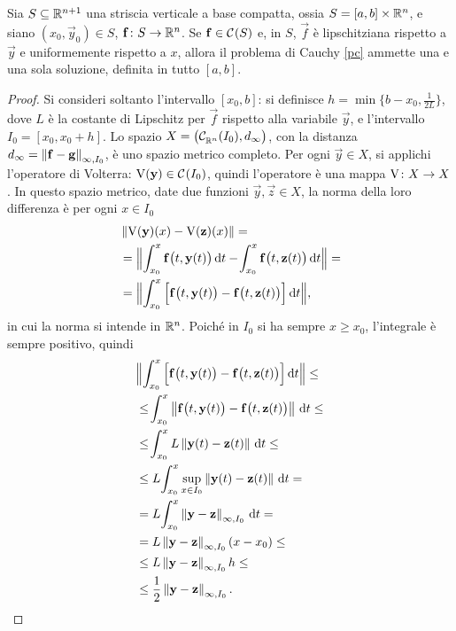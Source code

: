 \begin{teorema} \label{t:E-globale}
	Sia $S\subseteq\mathbb{R}^{n+1}$ una striscia verticale a base compatta, ossia $S=[a,b]\times\mathbb{R}^n$, e siano $(x_0,\vec y_0)\in S$, $\mathbf{f}\colon S\to\mathbb{R}^n$. Se $\mathbf{f}\in\mathcal{C}^{{}}(S)$ e, in $S$, $\vec f$ è lipschitziana rispetto a $\vec y$ e uniformemente rispetto a $x$, allora il problema di Cauchy \eqref{pc} ammette una e una sola soluzione, definita in tutto $[a,b]$.
\end{teorema}
\begin{proof}
Si consideri soltanto l'intervallo $[x_0,b]$: si definisce $h=\min\{b-x_0,\frac1{2L}\}$, dove $L$ è la costante di Lipschitz per $\vec f$ rispetto alla variabile $\vec y$, e l'intervallo $I_0=[x_0,x_0+h]$. Lo spazio $X=\big(\mathcal{C}^{{}}_{\mathbb{R}^n}(I_0),d_\infty\big)$, con la distanza $d_{\infty}=\left\|{\mathbf{f}-\mathbf{g}}\right\|_{\infty,I_0}$, è uno spazio metrico completo. Per ogni $\vec y\in X$, si applichi l'operatore di Volterra: $\operatorname{V}(\mathbf{y})\in\mathcal{C}^{{}}(I_0)$, quindi l'operatore è una mappa $\operatorname{V}\colon X\to X$. In questo spazio metrico, date due funzioni $\vec y,\vec z\in X$, la norma della loro differenza è per ogni $x\in I_0$
\begin{align*}
&\left\|{\operatorname{V}(\mathbf{y})(x)-\operatorname{V}(\mathbf{z})(x)}\right\|=\\
&=\Big\|\!\int_{x_0}^x\mathbf{f}\big(t,\mathbf{y}(t)\big)\,\textup{d} t-\!\int_{x_0}^x\mathbf{f}\big(t,\mathbf{z}(t)\big)\,\textup{d} t\Big\|=\\
&=\Big\|\!\int_{x_0}^x\Big[\mathbf{f}\big(t,\mathbf{y}(t)\big)-\mathbf{f}\big(t,\mathbf{z}(t)\big)\Big]\,\textup{d} t\Big\|,
\end{align*}
in cui la norma si intende in $\mathbb{R}^n$. Poiché in $I_0$ si ha sempre $x\geq x_0$, l'integrale è sempre positivo, quindi
\begin{align*}
&\Big\|\Int_{x_0}^x\Big[\vec f\big(t,\vec y(t)\big)-\vec f\big(t,\vec z(t)\big)\Big]\,\dd t\Big\|\leq\\
&\leq\Int_{x_0}^x\norm{\vec f\big(t,\vec y(t)\big)-\vec f\big(t,\vec z(t)\big)}\,\dd t\leq\\
&\leq\Int_{x_0}^xL\norm{\vec y(t)-\vec z(t)}\,\dd t\leq\\
&\leq L\Int_{x_0}^x\sup_{x\in I_0}\norm{\vec y(t)-\vec z(t)}\,\dd t=\\
&=L\Int_{x_0}^x\norm{\vec y-\vec z}_{\infty,I_0}\,\dd t=\\
&=L\norm{\vec y-\vec z}_{\infty,I_0}(x-x_0)\leq\\
&\leq L\norm{\vec y-\vec z}_{\infty,I_0}h\leq\\
&\leq\frac12\norm{\vec y-\vec z}_{\infty,I_0}.

\end{align*}
\end{proof}
